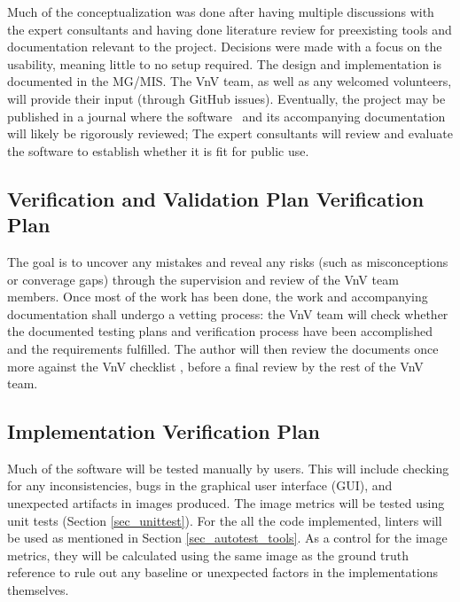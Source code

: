 \documentclass[12pt, titlepage]{article}
\begin{document}
Much of the conceptualization was done after having multiple discussions with the expert 
consultants and having done literature review for preexisting tools and documentation 
relevant to the project. Decisions were made with a focus on the usability, meaning little to 
no setup required. The design and implementation is documented in the 
MG\citep{MG}/MIS\citep{MIS}.
The VnV team, as well as any welcomed volunteers, will provide
their input (through GitHub issues). Eventually, the project may be published in a journal
where the software \progname~and its accompanying documentation will 
likely be rigorously reviewed; The expert consultants will review and evaluate the software to
establish whether it is fit for public use.



\subsection{Verification and Validation Plan Verification Plan}

The goal is to uncover any mistakes and reveal any risks (such as misconceptions or converage gaps) 
through the supervision and 
review of the VnV team members. Once most of the work has been done, the work and
accompanying documentation shall undergo a vetting process: the VnV team
will check whether the documented testing plans and verification process have been 
accomplished and the requirements fulfilled. The author will then review the documents once more
against the VnV checklist \citep{VnV_checklist}, before a final review by the rest of the VnV team.

\subsection{Implementation Verification Plan}  \label{sec_impl_vplan}

Much of the software will be tested manually by users. This will include checking for
any inconsistencies, bugs in the graphical user interface (GUI), and unexpected
artifacts in images produced.
The image metrics will be tested using unit tests (Section \ref{sec_unittest}). For the
all the code implemented, linters will be used as mentioned in Section \ref{sec_autotest_tools}.
As a control for the image metrics, they will be calculated using the same image as the ground truth 
reference to rule out any baseline or unexpected factors in the implementations themselves.
\end{document}
